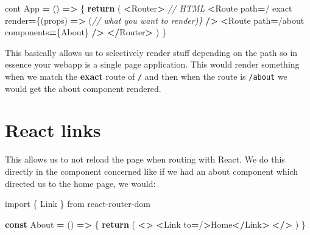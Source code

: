\documentclass[
]{report}
\newenvironment{Shaded}{\begin{snugshade}}{\end{snugshade}}
\newcommand{\CommentTok}[1]{\textcolor[rgb]{0.56,0.35,0.01}{\textit{#1}}}
\newcommand{\ControlFlowTok}[1]{\textcolor[rgb]{0.13,0.29,0.53}{\textbf{#1}}}
\newcommand{\ImportTok}[1]{#1}
\newcommand{\KeywordTok}[1]{\textcolor[rgb]{0.13,0.29,0.53}{\textbf{#1}}}
\newcommand{\NormalTok}[1]{#1}
\newcommand{\OperatorTok}[1]{\textcolor[rgb]{0.81,0.36,0.00}{\textbf{#1}}}
\newcommand{\StringTok}[1]{\textcolor[rgb]{0.31,0.60,0.02}{#1}}
\theoremstyle{definition}
\theoremstyle{definition}
\theoremstyle{definition}
\theoremstyle{definition}
\theoremstyle{remark}
\begin{document}
\begin{Shaded}
\begin{Highlighting}[]
\NormalTok{cont App }\OperatorTok{=}\NormalTok{ () }\KeywordTok{=\textgreater{}}\NormalTok{ \{}
    \ControlFlowTok{return}\NormalTok{ (}
        \OperatorTok{\textless{}}\NormalTok{Router}\OperatorTok{\textgreater{}}
            \CommentTok{// HTML}
            \OperatorTok{\textless{}}\NormalTok{Route }
\NormalTok{                path}\OperatorTok{=}\StringTok{\textquotesingle{}/\textquotesingle{}} 
\NormalTok{                exact }
\NormalTok{                render}\OperatorTok{=}\NormalTok{\{(props) }\KeywordTok{=\textgreater{}}\NormalTok{ (}\CommentTok{// what you want to render)\}}
            \OperatorTok{/\textgreater{}}
            \OperatorTok{\textless{}}\NormalTok{Route path}\OperatorTok{=}\StringTok{\textquotesingle{}/about\textquotesingle{}}\NormalTok{ components}\OperatorTok{=}\NormalTok{\{About\} }\OperatorTok{/\textgreater{}}
        \OperatorTok{\textless{}/}\NormalTok{Router}\OperatorTok{\textgreater{}}
\NormalTok{    )}
\NormalTok{\}}
\end{Highlighting}
\end{Shaded}

This basically allows us to selectively render stuff depending on the path so
in essence your webapp is a single page application. This would render
something when we match the \textbf{exact} route of \texttt{/} and then when the route is
\texttt{/about} we would get the about component rendered.

\hypertarget{react-links}{%
\section{React links}\label{react-links}}

This allows us to not reload the page when routing with React. We do this
directly in the component concerned like if we had an about component which
directed us to the home page, we would:

\begin{Shaded}
\begin{Highlighting}[]
\ImportTok{import}\NormalTok{ \{ Link \} }\ImportTok{from} \StringTok{\textquotesingle{}react{-}router{-}dom\textquotesingle{}}

\KeywordTok{const}\NormalTok{ About }\OperatorTok{=}\NormalTok{ () }\KeywordTok{=\textgreater{}}\NormalTok{ \{}
    \ControlFlowTok{return}\NormalTok{ (}
        \OperatorTok{\textless{}\textgreater{}}
            \OperatorTok{\textless{}}\NormalTok{Link to}\OperatorTok{=}\StringTok{\textquotesingle{}/\textquotesingle{}}\OperatorTok{\textgreater{}}\NormalTok{Home}\OperatorTok{\textless{}/}\NormalTok{Link}\OperatorTok{\textgreater{}}
        \OperatorTok{\textless{}/\textgreater{}}
\NormalTok{    )}
\NormalTok{\}}
\end{Highlighting}
\end{Shaded}
\end{document}
